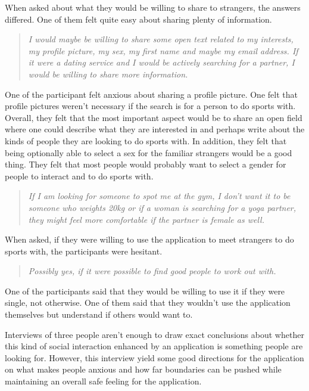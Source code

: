 When asked about what they would be willing to share to strangers, the answers differed. One of them felt quite easy about sharing plenty of information.

\begin{quotation}
\it I would maybe be willing to share some open text related to my interests, my profile picture, my sex, my first name and maybe my email address. If it were a dating service and I would be actively searching for a partner, I would be willing to share more information.
\end{quotation}

One of the participant felt anxious about sharing a profile picture. One felt that profile pictures weren't necessary if the search is for a person to do sports with. Overall, they felt that the most important aspect would be to share an open field where one could describe what they are interested in and perhaps write about the kinds of people they are looking to do sports with. In addition, they felt that being optionally able to select a sex for the familiar strangers would be a good thing. They felt that most people would probably want to select a gender for people to interact and to do sports with.

\begin{quotation}
\it If I am looking for someone to spot me at the gym, I don't want it to be someone who weights 20kg or if a woman is searching for a yoga partner, they might feel more comfortable if the partner is female as well.
\end{quotation}

When asked, if they were willing to use the application to meet strangers to do sports with, the participants were hesitant.

\begin{quotation}
\it Possibly yes, if it were possible to find good people to work out with.
\end{quotation}

One of the participants said that they would be willing to use it if they were single, not otherwise. One of them said that they wouldn't use the application themselves but understand if others would want to.

Interviews of three people aren't enough to draw exact conclusions about whether this kind of social interaction enhanced by an application is something people are looking for. However, this interview yield some good directions for the application on what makes people anxious and how far boundaries can be pushed while maintaining an overall safe feeling for the application.


